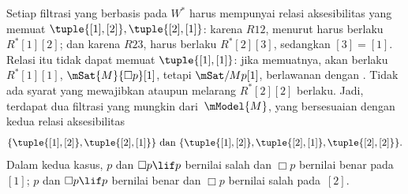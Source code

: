 \documentclass[../../../include/open-logic-section]{subfiles}
\begin{document}
\begin{ex}
  Setiap filtrasi yang berbasis pada $W^*$ harus mempunyai relasi
  aksesibilitas yang memuat $\tuple{[1], [2]}, \tuple{[2],[1]}$: karena
  $R12$, menurut 
  harus berlaku $R^*[1][2]$; dan karena $R23$, harus berlaku $R^*[2][3]$,
  sedangkan $[3]=[1]$. Relasi itu tidak dapat memuat $\tuple{[1],[1]}$:
  jika memuatnya, akan berlaku $R^*[1][1]$, $\mSat{M}{\Box p}[1]$, tetapi
  $\mSat/{M}{p}[1]$, berlawanan dengan
  . Tidak ada syarat yang mewajibkan ataupun
  melarang $R^*[2][2]$ berlaku. Jadi, terdapat dua filtrasi yang mungkin
  dari~$\mModel{M}$, yang bersesuaian dengan kedua relasi aksesibilitas
  \[
  \{\tuple{[1],[2]}, \tuple{[2],[1]}\} \text{ dan }
  \{\tuple{[1],[2]}, \tuple{[2],[1]}, \tuple{[2],[2]}\}.
  \]
  Dalam kedua kasus, $p$ dan $\Box p \lif p$ bernilai salah dan $\Box p$
  bernilai benar pada~$[1]$; $p$ dan $\Box p \lif p$ bernilai benar dan
  $\Box p$ bernilai salah pada~$[2]$.
\end{ex}
\end{document}
